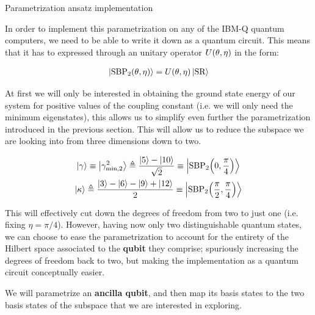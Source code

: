\documentclass[9pt, handout, aspectratio=169]{beamer}	%
\begin{document}
\begin{frame}[allowframebreaks]{Parametrization ansatz implementation}

	In order to implement this parametrization on any of the IBM-Q quantum computers, we need to be able to write it down as a quantum circuit. This means that it has to expressed through an unitary operator $U\qty(\theta, \eta)$ in the form:

	\begin{gather}
	  \ket{\text{SBP}_{2} \qty(\theta, \eta)} =
	    U\qty(\theta, \eta) \ket{\text{SR}}
	\end{gather}

	At first we will only be interested in obtaining the ground state energy of our system for positive values of the coupling constant (i.e. we will only need the minimum eigenstates), this allows us to simplify even further the parametrization introduced in the previous section. This will allow us to reduce the subspace we are looking into from three dimensions down to two.

	\begin{gather}
	  \ket{\gamma} \equiv
	    \ket{\gamma_{\text{min},2}^2} \triangleq
	    \frac{\ket{5} - \ket{10}}{\sqrt{2}} \equiv
	    \ket{\text{SBP}_{2} \qty(0, \frac{\pi}{4})} \\
	  \ket{\kappa} \triangleq
	    \frac{\ket{3}-\ket{6}-\ket{9}+\ket{12}}{2} \equiv
	    \ket{\text{SBP}_{2} \qty(\frac{\pi}{2}, \frac{\pi}{4})}
	\end{gather}

\break

	\begin{multicols}{2}

		This will effectively cut down the degrees of freedom from two to just one (i.e. fixing $\eta=\pi/4$). However, having now only two distinguishable quantum states, we can choose to ease the parametrization to account for the entirety of the Hilbert space associated to the \textbf{qubit} they comprise; spuriously increasing the degrees of freedom back to two, but making the implementation as a quantum circuit conceptually easier.

		\medskip

		We will parametrize an \textbf{ancilla qubit}, and then map its basis states to the two basis states of the subspace that we are interested in exploring.

		\columnbreak


\end{multicols}
\end{frame}
\end{document}
